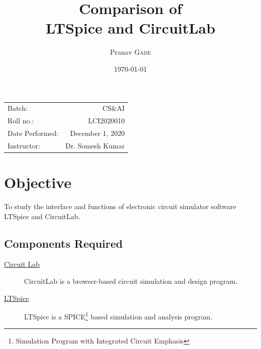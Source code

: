 \documentclass{article}
\title{Comparison of \\ LTSpice and CircuitLab} %
\author{Pranav \textsc{Gade}} %
\date{\today} %
\begin{document}
\maketitle %

\begin{center}
\begin{tabular}{l r}
Batch: & CS\&AI \\
Roll no.: & LCI2020010 \\
Date Performed: & December 1, 2020 \\ %
Instructor: & Dr. Somesh Kumar %
\end{tabular}
\end{center}



\section{Objective}

To study the interface and functions of electronic circuit simulator software LTSpice and CircuitLab.


\subsection{Components Required}
\label{definitions}
\begin{description}
\item[\href{https://www.circuitlab.com/}{Circuit Lab}]
CircuitLab is a browser-based circuit simulation and design program.
\item[\href{https://www.analog.com/en/design-center/design-tools-and-calculators/ltspice-simulator.html}{LTSpice}]
LTSpice is a SPICE\footnote{Simulation Program with Integrated Circuit Emphasis} based simulation and analysis program.
\end{description} 
 
\end{document}
